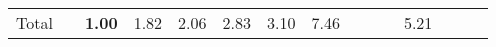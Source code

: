\begin{tabular}{ll|rrrrrr|rrrrrrr}
  \hline
  Total  & &



  


  
  \textbf{1.00} & 1.82 & 2.06 & 2.83 & 3.10 & 7.46 &  &  &  & 5.21 &  \\


\end{tabular}
